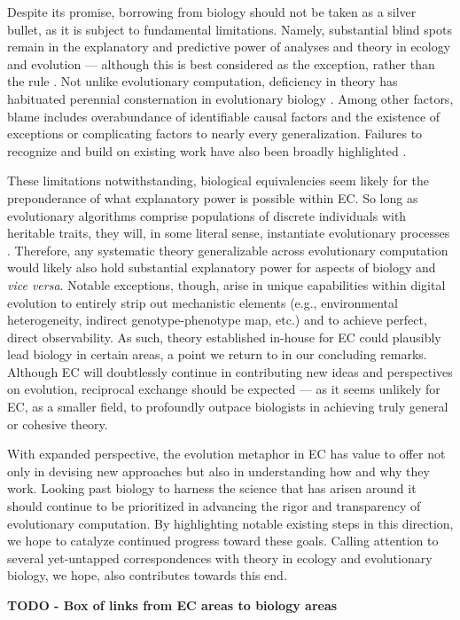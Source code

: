 


Despite its promise, borrowing from biology should not be taken as a silver bullet, as it is subject to fundamental limitations.
Namely, substantial blind spots remain in the explanatory and predictive power of analyses and theory in ecology and evolution \citep{houlahan2016priority,catford2022addressing,yates2018outstanding} --- although this is best considered as the exception, rather than the rule \citep{lynch2025complexity}.
Not unlike evolutionary computation, deficiency in theory has habituated perennial consternation in evolutionary biology \citep{welch2017wrong}.
Among other factors, blame includes overabundance of identifiable causal factors and the existence of exceptions or complicating factors to nearly every generalization.
Failures to recognize and build on existing work have also been broadly highlighted \citep{lynch2025complexity,beer2024alife}.

These limitations notwithstanding, biological equivalencies seem likely for the preponderance of what explanatory power is possible within EC.
So long as evolutionary algorithms comprise populations of discrete individuals with heritable traits, they will, in some literal sense, instantiate evolutionary processes \citep{pennock2007models}.
Therefore, any systematic theory generalizable across evolutionary computation would likely also hold substantial explanatory power for aspects of biology and \textit{vice versa}.
Notable exceptions, though, arise in unique capabilities within digital evolution to entirely strip out mechanistic elements (e.g., environmental heterogeneity, indirect genotype-phenotype map, etc.) and to achieve perfect, direct observability.
As such, theory established in-house for EC could plausibly lead biology in certain areas, a point we return to in our concluding remarks.
Although EC will doubtlessly continue in contributing new ideas and perspectives on evolution, reciprocal exchange should be expected --- as it seems unlikely for EC, as a smaller field, to profoundly outpace biologists in achieving truly general or cohesive theory.

With expanded perspective, the evolution metaphor in EC has value to offer not only in devising new approaches but also in understanding how and why they work.
Looking past biology to harness the science that has arisen around it should continue to be prioritized in advancing the rigor and transparency of evolutionary computation.
By highlighting notable existing steps in this direction, we hope to catalyze continued progress toward these goals.
Calling attention to several yet-untapped correspondences with theory in ecology and evolutionary biology, we hope, also contributes towards this end.

\textbf{TODO - Box of links from EC areas to biology areas
}